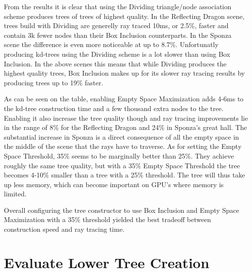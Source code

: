 From the results it is clear that using the Dividing triangle/node association
scheme produces trees of trees of highest quality. In the Reflecting Dragon
scene, trees build with Dividing are generelly ray traced 10ms, or 2.5\%, faster
and contain 3k fewer nodes than their Box Inclusion counterparts. In the Sponza
scene the difference is even more noticeable at up to 8.7\%. Unfortunatly
producing kd-trees using the Dividing scheme is a lot slower than using Box
Inclusion. In the above scenes this means that while Dividing produces the
highest quality trees, Box Inclusion makes up for its slower ray tracing results
by producing trees up to 19\% faster.

As can be seen on the table, enabling Empty Space Maximization adds 4-6ms to the
kd-tree construction time and a few thousand extra nodes to the tree. Enabling
it also increase the tree quality though and ray tracing improvements lie in the
range of 8\% for the Reflecting Dragon and 24\% in Sponza's great hall. The
substantial increase in Sponza is a direct consequence of all the empty space in
the middle of the scene that the rays have to traverse. As for setting the Empty
Space Threshold, 35\% seems to be marginally better than 25\%. They achieve
roughly the same tree quality, but with a 35\% Empty Space Threshold the tree
becomes 4-10\% smaller than a tree with a 25\% threshold. The tree will thus
take up less memory, which can become important on GPU's where memory is
limited.

Overall configuring the tree constructor to use Box Inclusion and Empty Space
Maximization with a 35\% threshold yielded the best tradeoff between
construction speed and ray tracing time.

\section{Evaluate Lower Tree Creation}\label{sec:evaluateLowerTree}



